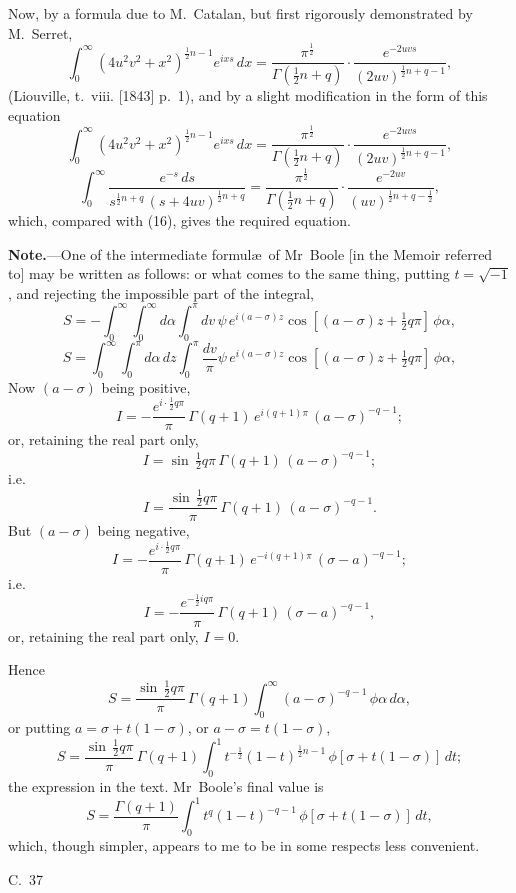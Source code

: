 \documentclass[11pt,a4paper]{book}
\begin{document}
Now, by a formula due to M.~Catalan, but first rigorously demonstrated by M.~Serret,
\[
\int_0^\infty (4u^2v^2 + x^2)^{\frac{1}{2}n-1} e^{ixs}\,dx = \frac{\pi^{\frac{1}{2}}}{\Gamma(\frac{1}{2}n+q)} \cdot \frac{e^{-2uvs}}{(2uv)^{\frac{1}{2}n+q-1}},
\]
(Liouville, t.~viii. [1843] p.~1), and by a slight modification in the form of this equation
\[
\int_0^\infty (4u^2v^2 + x^2)^{\frac{1}{2}n-1} e^{ixs}\,dx = \frac{\pi^{\frac{1}{2}}}{\Gamma(\frac{1}{2}n+q)} \cdot \frac{e^{-2uvs}}{(2uv)^{\frac{1}{2}n+q-1}},
\]
\[
\int_0^\infty \frac{e^{-s}\,ds}{s^{\frac{1}{2}n+q}\,(s+4uv)^{\frac{1}{2}n+q}} = \frac{\pi^{\frac{1}{2}}}{\Gamma(\frac{1}{2}n+q)} \cdot \frac{e^{-2uv}}{(uv)^{\frac{1}{2}n+q-\frac{1}{2}}},
\]
which, compared with (16), gives the required equation.

\vspace{10pt}
\textbf{Note.}---One of the intermediate formul\ae\ of Mr~Boole [in the Memoir referred to] may be written as follows: or what comes to the same thing, putting $t = \surd{-1}$, and rejecting the impossible part of the integral,
\[
S = -\int_0^\infty \int_0^\infty d\alpha \int_0^\pi dv\,\psi\,e^{i(a-\sigma)z} \cos[(a-\sigma)z + \tfrac{1}{2}q\pi]\,\phi\alpha,
\]
\[
S = \int_0^\infty \int_0^\pi d\alpha\,dz \int_0^\pi \frac{dv}{\pi} \psi\,e^{i(a-\sigma)z} \cos[(a-\sigma)z + \tfrac{1}{2}q\pi]\,\phi\alpha,
\]
Now $(a-\sigma)$ being positive,
\[
I = -\frac{e^{i\cdot\frac{1}{2}q\pi}}{\pi}\,\Gamma(q+1)\,e^{i(q+1)\pi}\,(a-\sigma)^{-q-1};
\]
or, retaining the real part only,
\[
I = \sin\,\tfrac{1}{2}q\pi\,\Gamma(q+1)\,(a-\sigma)^{-q-1};
\]
i.e.
\[
I = \frac{\sin\,\tfrac{1}{2}q\pi}{\pi}\,\Gamma(q+1)\,(a-\sigma)^{-q-1}.
\]
But $(a-\sigma)$ being negative,
\[
I = -\frac{e^{i\cdot\frac{1}{2}q\pi}}{\pi}\,\Gamma(q+1)\,e^{-i(q+1)\pi}\,(\sigma-a)^{-q-1};
\]
i.e.
\[
I = -\frac{e^{-\frac{1}{2}i q\pi}}{\pi}\,\Gamma(q+1)\,(\sigma-a)^{-q-1},
\]
or, retaining the real part only, $I = 0$.

Hence
\[
S = \frac{\sin\,\tfrac{1}{2}q\pi}{\pi}\,\Gamma(q+1) \int_0^\infty (a-\sigma)^{-q-1}\,\phi\alpha\,d\alpha,
\]
or putting $a = \sigma + t(1-\sigma)$, or $a-\sigma = t(1-\sigma)$,
\[
S = \frac{\sin\,\tfrac{1}{2}q\pi}{\pi}\,\Gamma(q+1) \int_0^1 t^{-\frac{1}{2}}(1-t)^{\frac{1}{2}n-1}\,\phi[\sigma + t(1-\sigma)]\,dt;
\]
the expression in the text. Mr~Boole's final value is
\[
S = \frac{\Gamma(q+1)}{\pi} \int_0^1 t^{q}(1-t)^{-q-1}\,\phi[\sigma + t(1-\sigma)]\,dt,
\]
which, though simpler, appears to me to be in some respects less convenient.

\begin{center}
C.~37
\end{center}
\end{document}
